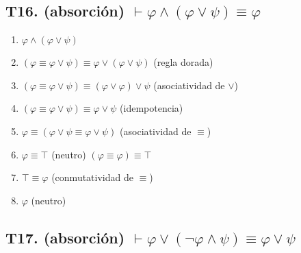 \documentclass[a4paper,11pt]{article}
\begin{document}
\subsection{T16. (absorción) $\vdash \varphi \land (\varphi \lor \psi) \equiv \varphi $}

\begin{enumerate}
    \item $\varphi \land (\varphi \lor \psi)$
    \item $(\varphi \equiv \varphi \lor \psi) \equiv \varphi \lor (\varphi \lor \psi)$ \hfill (regla dorada)
    \item $(\varphi \equiv \varphi \lor \psi) \equiv (\varphi \lor \varphi) \lor \psi$ \hfill (asociatividad de $\lor$)
    \item $(\varphi \equiv \varphi \lor \psi) \equiv \varphi \lor \psi$ \hfill (idempotencia)
    \item $\varphi \equiv (\varphi \lor \psi \equiv \varphi \lor \psi)$ \hfill (asociatividad de $\equiv$)
    \item $\varphi \equiv \top$ \hfill (neutro) $(\varphi \equiv \varphi) \equiv \top$
    \item $\top \equiv \varphi$ \hfill (conmutatividad de $\equiv$)
    \item $\varphi$ \hfill (neutro)
\end{enumerate}

\subsection{T17. (absorción) $\vdash \varphi \lor (\neg\varphi \land \psi) \equiv \varphi \lor \psi $}
\end{document}
